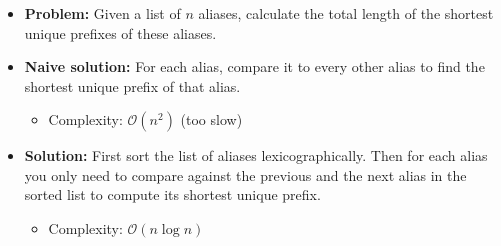 \begin{frame}
    \frametitle{\problemtitle}
    \begin{itemize}
        \item<+-> \textbf{Problem:} Given a list of $n$ aliases, calculate the total length of the shortest unique prefixes of these aliases.
	\item<+-> \textbf{Naive solution:} For each alias, compare it to every other alias to find the shortest unique prefix of that alias.
	\begin{itemize}
		\item Complexity: $\mathcal O(n^2)$ (too slow)
	\end{itemize}
	\item<+-> \textbf{Solution:} First sort the list of aliases lexicographically. Then for each alias you only need to compare against the previous and the next alias in the sorted list to compute its shortest unique prefix.
	\begin{itemize}
		\item Complexity: $\mathcal O(n \log n)$
	\end{itemize}
    \end{itemize}
    \solvestats
\end{frame}
